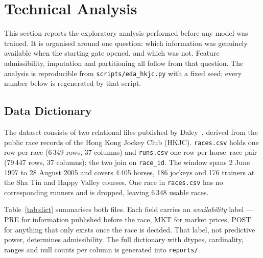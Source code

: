 %
%
%

\section{Technical Analysis}
\label{sec:analysis}

This section reports the exploratory analysis performed before any model
was trained. It is organised around one question: which information was
genuinely available when the starting gate opened, and which was not.
Feature admissibility, imputation and partitioning all follow from that
question. The analysis is reproducible from \texttt{scripts/eda\_hkjc.py}
with a fixed seed; every number below is regenerated by that script.

\subsection{Data Dictionary}
\label{sec:dict}

The dataset consists of two relational files published by
Daley~\cite{ejeC_daley_hkracing}, derived from the public race records of
the Hong Kong Jockey Club (HKJC). \texttt{races.csv} holds one row per
race (6\,349 rows, 37 columns) and \texttt{runs.csv} one row per
horse--race pair (79\,447 rows, 37 columns); the two join on
\texttt{race\_id}. The window spans 2 June 1997 to 28 August 2005 and
covers 4\,405 horses, 186 jockeys and 176 trainers at the Sha Tin and
Happy Valley courses. One race in \texttt{races.csv} has no corresponding
runners and is dropped, leaving 6\,348 usable races.

Table~\ref{tab:dict} summarises both files. Each field carries an
\emph{availability} label --- PRE for information published before the
race, MKT for market prices, POST for anything that only exists once the
race is decided. That label, not predictive power, determines
admissibility. The full dictionary with dtypes, cardinality, ranges and
null counts per column is generated into \texttt{reports/}.

